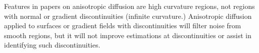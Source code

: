 Features in papers on anisotropic diffusion are high curvature regions,
not regions with normal or gradient discontinuities (infinite curvature.)
Anisotropic diffusion applied to surfaces or gradient fields
with discontinuities will filter noise from smooth regions,
but it will not improve estimations at discontinuities
or assist in identifying such discontinuities.

